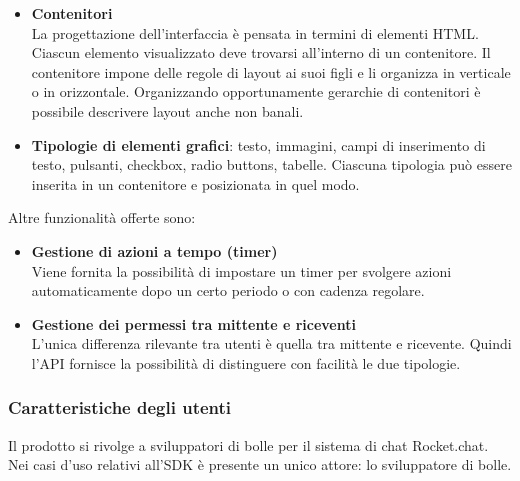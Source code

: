 \begin{itemize}
\item \textbf{Contenitori}\\
  La progettazione dell'interfaccia è pensata in termini di
  elementi HTML. Ciascun elemento visualizzato deve trovarsi
  all'interno di un contenitore. Il contenitore impone delle regole
  di layout ai suoi figli e li organizza in verticale o in
  orizzontale. Organizzando opportunamente gerarchie di contenitori
  è possibile descrivere layout anche non banali.
\item \textbf{Tipologie di elementi grafici}: testo, immagini, campi
  di inserimento di testo, pulsanti, checkbox, radio buttons,
  tabelle. Ciascuna tipologia può essere inserita in un contenitore e
  posizionata in quel modo.

\end{itemize} %

Altre funzionalità offerte sono:
\begin{itemize}
\item \textbf{Gestione di azioni a tempo (timer)}\\
Viene fornita la possibilità di impostare un timer per svolgere azioni
automaticamente dopo un certo periodo o con cadenza regolare.

\item \textbf{Gestione dei permessi tra mittente e riceventi}\\
L'unica differenza rilevante tra utenti è quella tra mittente e
ricevente. Quindi l'API fornisce  la possibilità di distinguere con
facilità le due tipologie.
\end{itemize}






\subsubsection{Caratteristiche degli utenti}
Il prodotto si rivolge a sviluppatori di bolle per il sistema di chat
Rocket.chat.
Nei casi d'uso relativi all'SDK è presente un unico attore: lo
sviluppatore di bolle.

